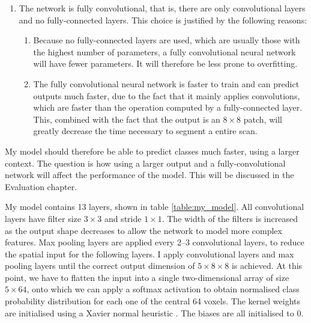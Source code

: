 \documentclass[12pt,a4paper,twoside,openright]{report}
\begin{document}
\begin{enumerate}
	\item The network is fully convolutional, that is, there are only convolutional layers and no fully-connected layers. This choice is justified by the following reasons:
	\begin{enumerate}
		\item Because no fully-connected layers are used, which are usually those with the highest number of parameters, a fully convolutional neural network will have fewer parameters. It will therefore be less prone to overfitting.
		\item The fully convolutional neural network is faster to train and can predict outputs much faster, due to the fact that it mainly applies convolutions, which are faster than the operation computed by a fully-connected layer. This, combined with the fact that the output is an $8 \times 8$ patch, will greatly decrease the time necessary to segment a entire scan.
	\end{enumerate}
\end{enumerate}

My model should therefore be able to predict classes much faster, using a larger context. The question is how using a larger output and a fully-convolutional network will affect the performance of the model. This will be discussed in the Evaluation chapter.

My model contains 13 layers, shown in table \ref{table:my_model}. All convolutional layers have filter size $3 \times 3$ and stride $1 \times 1$. The width of the filters is increased as the output shape decreases to allow the network to model more complex features. Max pooling layers are applied every 2--3 convolutional layers, to reduce the spatial input for the following layers. I apply convolutional layers and max pooling layers until the correct output dimension of $5 \times 8 \times 8$ is achieved. At this point, we have to flatten the input into a single two-dimensional array of size $5 \times 64$, onto which we can apply a softmax activation to obtain normalised class probability distribution for each one of the central 64 voxels. The kernel weights are initialised using a Xavier normal heuristic \cite{xavier_init}. The biases are all initialised to 0.
\end{document}
